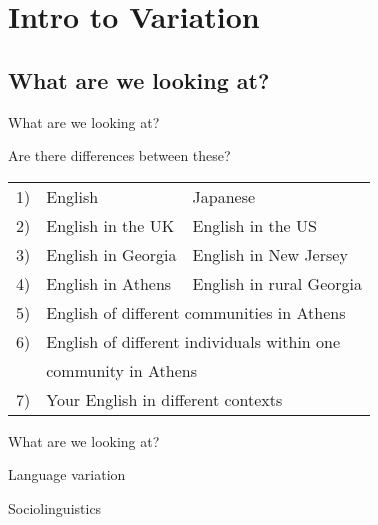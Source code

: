 \documentclass{beamer}
\subtitle[Variation and Varieties]{Introduction to Language Variation and Language Varieties}
\newcommand{\suboneone}{What are we looking at?}
\begin{document}
  

  \section{Intro to Variation}
    \subsection{\suboneone}
      \begin{frame}{\suboneone}
        \begin{block}{Are there differences between these?}
          \begin{tabular}{r l @{ vs } l}
            1)  & English                                       & Japanese                            \\
            2)  & English in the UK                             & English in the US                   \\
            3)  & English in Georgia                            & English in New Jersey               \\
            4)  & English in Athens                             & English in rural Georgia            \\
            5)  & \multicolumn{2}{l}{English of different communities in Athens}                      \\
            6)  & \multicolumn{2}{l}{English of different individuals within one} \\
                & \multicolumn{2}{l}{community in Athens} \\
            7)  & \multicolumn{2}{l}{Your English in different contexts}
          \end{tabular}
        \end{block}
      \end{frame}

      \begin{frame}{\suboneone}
        \begin{alertblock}{Language variation}
          
        \end{alertblock}
        \begin{alertblock}{Sociolinguistics}
          
        \end{alertblock}
      \end{frame}
\end{document}
